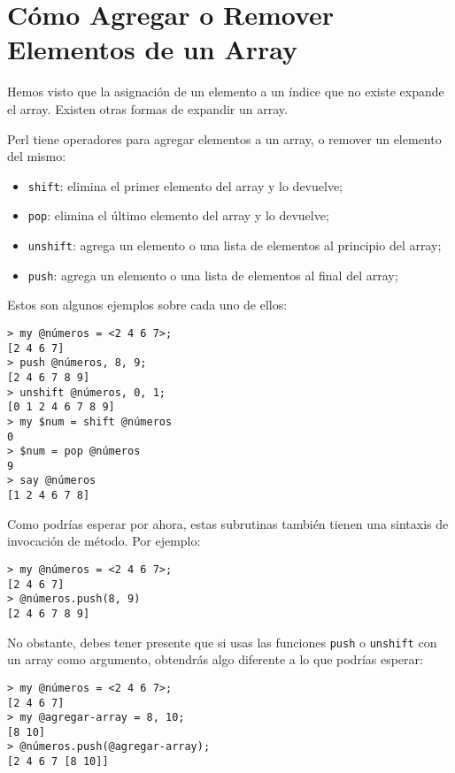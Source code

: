 \section{Cómo Agregar o Remover Elementos de un Array}

Hemos visto que la asignación de un elemento a un índice 
que no existe expande el array. Existen otras formas de expandir
un array.

Perl tiene operadores para agregar elementos a un array, o remover
un elemento del mismo:

\begin{itemize}
\item {\tt shift}: elimina el primer elemento del array y lo devuelve;
\item {\tt pop}: elimina el último elemento del array y lo devuelve;
\item {\tt unshift}: agrega un elemento o una lista de elementos al principio 
del array;
\item {\tt push}: agrega un elemento o una lista de elementos al final 
del array;
\end{itemize}

Estos son algunos ejemplos sobre cada uno de ellos:

\begin{lstlisting}
> my @números = <2 4 6 7>;
[2 4 6 7]
> push @números, 8, 9;
[2 4 6 7 8 9]
> unshift @números, 0, 1;
[0 1 2 4 6 7 8 9]
> my $num = shift @números
0
> $num = pop @números
9
> say @números
[1 2 4 6 7 8]
\end{lstlisting}

Como podrías esperar por ahora, estas subrutinas también
tienen una sintaxis de invocación de método. Por ejemplo:

\begin{lstlisting}
> my @números = <2 4 6 7>;
[2 4 6 7]
> @números.push(8, 9)
[2 4 6 7 8 9]
\end{lstlisting}

No obstante, debes tener presente que si usas las funciones
{\tt push} o {\tt unshift} con un array como argumento, 
obtendrás algo diferente a lo que podrías esperar:

\begin{lstlisting}
> my @números = <2 4 6 7>;
[2 4 6 7]
> my @agregar-array = 8, 10;
[8 10]
> @números.push(@agregar-array);
[2 4 6 7 [8 10]]
\end{lstlisting}

